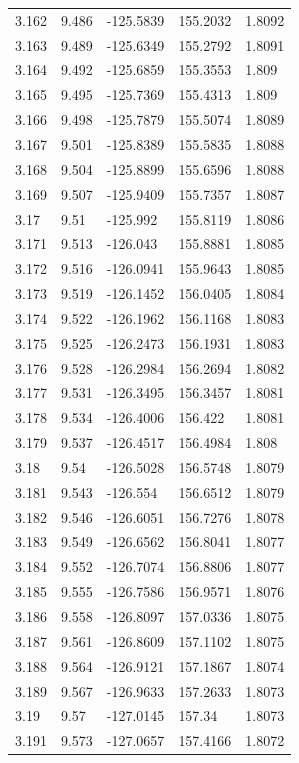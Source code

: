 \begin{tabular}{lllll}
3.162 & 9.486 & -125.5839 & 155.2032 & 1.8092 \\
3.163 & 9.489 & -125.6349 & 155.2792 & 1.8091 \\
3.164 & 9.492 & -125.6859 & 155.3553 & 1.809 \\
3.165 & 9.495 & -125.7369 & 155.4313 & 1.809 \\
3.166 & 9.498 & -125.7879 & 155.5074 & 1.8089 \\
3.167 & 9.501 & -125.8389 & 155.5835 & 1.8088 \\
3.168 & 9.504 & -125.8899 & 155.6596 & 1.8088 \\
3.169 & 9.507 & -125.9409 & 155.7357 & 1.8087 \\
3.17 & 9.51 & -125.992 & 155.8119 & 1.8086 \\
3.171 & 9.513 & -126.043 & 155.8881 & 1.8085 \\
3.172 & 9.516 & -126.0941 & 155.9643 & 1.8085 \\
3.173 & 9.519 & -126.1452 & 156.0405 & 1.8084 \\
3.174 & 9.522 & -126.1962 & 156.1168 & 1.8083 \\
3.175 & 9.525 & -126.2473 & 156.1931 & 1.8083 \\
3.176 & 9.528 & -126.2984 & 156.2694 & 1.8082 \\
3.177 & 9.531 & -126.3495 & 156.3457 & 1.8081 \\
3.178 & 9.534 & -126.4006 & 156.422 & 1.8081 \\
3.179 & 9.537 & -126.4517 & 156.4984 & 1.808 \\
3.18 & 9.54 & -126.5028 & 156.5748 & 1.8079 \\
3.181 & 9.543 & -126.554 & 156.6512 & 1.8079 \\
3.182 & 9.546 & -126.6051 & 156.7276 & 1.8078 \\
3.183 & 9.549 & -126.6562 & 156.8041 & 1.8077 \\
3.184 & 9.552 & -126.7074 & 156.8806 & 1.8077 \\
3.185 & 9.555 & -126.7586 & 156.9571 & 1.8076 \\
3.186 & 9.558 & -126.8097 & 157.0336 & 1.8075 \\
3.187 & 9.561 & -126.8609 & 157.1102 & 1.8075 \\
3.188 & 9.564 & -126.9121 & 157.1867 & 1.8074 \\
3.189 & 9.567 & -126.9633 & 157.2633 & 1.8073 \\
3.19 & 9.57 & -127.0145 & 157.34 & 1.8073 \\
3.191 & 9.573 & -127.0657 & 157.4166 & 1.8072 \\

\end{tabular}
